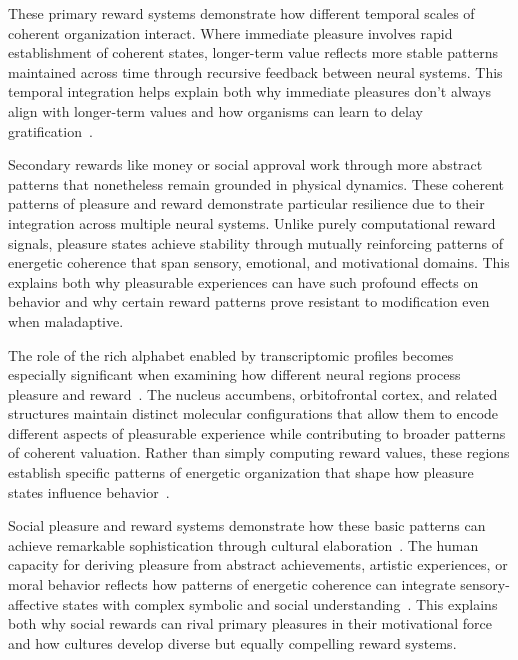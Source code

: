 These primary reward systems demonstrate how different temporal scales of coherent organization interact. Where immediate pleasure involves rapid establishment of coherent states, longer-term value reflects more stable patterns maintained across time through recursive feedback between neural systems. This temporal integration helps explain both why immediate pleasures don't always align with longer-term values and how organisms can learn to delay gratification~\cite{amil2024theta}.

Secondary rewards like money or social approval work through more abstract patterns that nonetheless remain grounded in physical dynamics. These coherent patterns of pleasure and reward demonstrate particular resilience due to their integration across multiple neural systems. Unlike purely computational reward signals, pleasure states achieve stability through mutually reinforcing patterns of energetic coherence that span sensory, emotional, and motivational domains. This explains both why pleasurable experiences can have such profound effects on behavior and why certain reward patterns prove resistant to modification even when maladaptive.

The role of the rich alphabet enabled by transcriptomic profiles becomes especially significant when examining how different neural regions process pleasure and reward~\cite{Girdhar2025}. The nucleus accumbens, orbitofrontal cortex, and related structures maintain distinct molecular configurations that allow them to encode different aspects of pleasurable experience while contributing to broader patterns of coherent valuation. Rather than simply computing reward values, these regions establish specific patterns of energetic organization that shape how pleasure states influence behavior~\cite{pinotsis2023vivo}.

Social pleasure and reward systems demonstrate how these basic patterns can achieve remarkable sophistication through cultural elaboration~\cite{harris2019conscious}. The human capacity for deriving pleasure from abstract achievements, artistic experiences, or moral behavior reflects how patterns of energetic coherence can integrate sensory-affective states with complex symbolic and social understanding~\cite{butlin2023consciousnessartificialintelligenceinsights}. This explains both why social rewards can rival primary pleasures in their motivational force and how cultures develop diverse but equally compelling reward systems.

